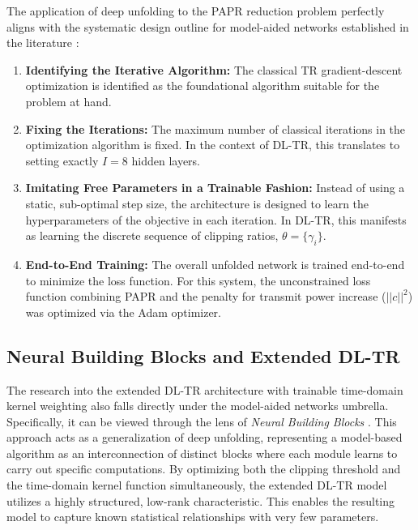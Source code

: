 The application of deep unfolding to the PAPR reduction problem perfectly aligns with the systematic design outline for model-aided networks established in the literature \cite{modelbased}:
\begin{enumerate}
    \item \textbf{Identifying the Iterative Algorithm:} The classical TR gradient-descent optimization is identified as the foundational algorithm suitable for the problem at hand.
    \item \textbf{Fixing the Iterations:} The maximum number of classical iterations in the optimization algorithm is fixed. In the context of DL-TR, this translates to setting exactly $I=8$ hidden layers.
    \item \textbf{Imitating Free Parameters in a Trainable Fashion:} Instead of using a static, sub-optimal step size, the architecture is designed to learn the hyperparameters of the objective in each iteration. In DL-TR, this manifests as learning the discrete sequence of clipping ratios, $\theta = \{\gamma_i\}$.
    \item \textbf{End-to-End Training:} The overall unfolded network is trained end-to-end to minimize the loss function. For this system, the unconstrained loss function combining PAPR and the penalty for transmit power increase ($||c||^2$) was optimized via the Adam optimizer.
\end{enumerate}

\subsection{Neural Building Blocks and Extended DL-TR}
The research into the extended DL-TR architecture with trainable time-domain kernel weighting also falls directly under the model-aided networks umbrella. Specifically, it can be viewed through the lens of \textit{Neural Building Blocks} \cite{dl_tr}. This approach acts as a generalization of deep unfolding, representing a model-based algorithm as an interconnection of distinct blocks where each module learns to carry out specific computations. By optimizing both the clipping threshold and the time-domain kernel function simultaneously, the extended DL-TR model utilizes a highly structured, low-rank characteristic. This enables the resulting model to capture known statistical relationships with very few parameters.

